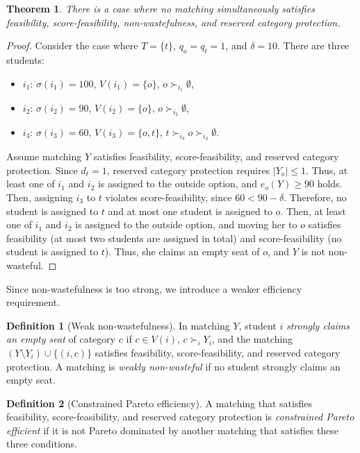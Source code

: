 \documentclass[a4paper,twoside]{article}
\newtheorem{theorem}{Theorem}
\theoremstyle{definition}
\newtheorem{definition}{Definition}
\begin{document}
\begin{theorem}
\label{thm:imp1}
There is a case where no matching simultaneously satisfies feasibility,
score-feasibility, non-wastefulness, and reserved category protection.
\end{theorem}
\begin{proof}
Consider the case where $T=\{t\}$, $q_o=q_t=1$, and $\delta=10$.
There are three students:
\begin{itemize}
\item $i_1$: $\sigma(i_1)=100$, $V(i_1)=\{o\}$, $o\succ_{i_1}\emptyset$,
\item $i_2$: $\sigma(i_2)=90$, $V(i_2)=\{o\}$, $o\succ_{i_2}\emptyset$,
\item $i_3$: $\sigma(i_3)=60$, $V(i_3)=\{o,t\}$,
$t\succ_{i_3}o\succ_{i_3}\emptyset$.
\end{itemize}
Assume matching $Y$ satisfies feasibility, score-feasibility, and reserved category
protection.
Since $d_t=1$, reserved category protection requires $|Y_o|\le 1$.
Thus, at least one of $i_1$ and $i_2$ is assigned to the outside option, and
$e_o(Y)\ge 90$ holds.
Then, assigning $i_3$ to $t$ violates score-feasibility, since $60<90-\delta$.
Therefore, no student is assigned to $t$ and at most one student is assigned to $o$.
Then, at least one of $i_1$ and $i_2$ is assigned to the outside option, and
moving her to $o$ satisfies feasibility (at most two students are assigned in total) and
score-feasibility (no student is assigned to $t$).
Thus, she claims an empty seat of $o$, and $Y$ is not non-wasteful.
\end{proof}

Since non-wastefulness is too strong, we introduce a weaker efficiency requirement.

\begin{definition}[Weak non-wastefulness]
\label{def:wnw}
In matching $Y$, student $i$ \emph{strongly claims an empty seat} of category $c$ if
$c\in V(i)$, $c\succ_i Y_i$, and the matching $(Y\setminus Y_i)\cup\{(i,c)\}$ satisfies
feasibility, score-feasibility, and reserved category protection.
A matching is \emph{weakly non-wasteful} if no student strongly claims an empty seat.
\end{definition}

\begin{definition}[Constrained Pareto efficiency]
\label{def:cpe}
A matching that satisfies feasibility, score-feasibility, and reserved category
protection is \emph{constrained Pareto efficient} if it is not Pareto dominated by
another matching that satisfies these three conditions.
\end{definition}
\end{document}

